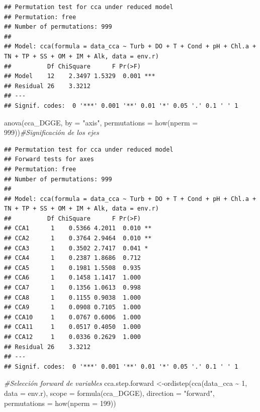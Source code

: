\documentclass[
]{book}
\newenvironment{Shaded}{\begin{snugshade}}{\end{snugshade}}
\newcommand{\AttributeTok}[1]{\textcolor[rgb]{0.77,0.63,0.00}{#1}}
\newcommand{\CommentTok}[1]{\textcolor[rgb]{0.56,0.35,0.01}{\textit{#1}}}
\newcommand{\DecValTok}[1]{\textcolor[rgb]{0.00,0.00,0.81}{#1}}
\newcommand{\FunctionTok}[1]{\textcolor[rgb]{0.00,0.00,0.00}{#1}}
\newcommand{\NormalTok}[1]{#1}
\newcommand{\OtherTok}[1]{\textcolor[rgb]{0.56,0.35,0.01}{#1}}
\newcommand{\SpecialCharTok}[1]{\textcolor[rgb]{0.00,0.00,0.00}{#1}}
\newcommand{\StringTok}[1]{\textcolor[rgb]{0.31,0.60,0.02}{#1}}
\begin{document}
\begin{verbatim}
## Permutation test for cca under reduced model
## Permutation: free
## Number of permutations: 999
## 
## Model: cca(formula = data_cca ~ Turb + DO + T + Cond + pH + Chl.a + TN + TP + SS + OM + IM + Alk, data = env.r)
##          Df ChiSquare      F Pr(>F)    
## Model    12    2.3497 1.5329  0.001 ***
## Residual 26    3.3212                  
## ---
## Signif. codes:  0 '***' 0.001 '**' 0.01 '*' 0.05 '.' 0.1 ' ' 1
\end{verbatim}

\begin{Shaded}
\begin{Highlighting}[]
\FunctionTok{anova}\NormalTok{(cca\_DGGE, }\AttributeTok{by =} \StringTok{"axis"}\NormalTok{, }\AttributeTok{permutations =} \FunctionTok{how}\NormalTok{(}\AttributeTok{nperm =} \DecValTok{999}\NormalTok{))}\CommentTok{\#Significación de los ejes}
\end{Highlighting}
\end{Shaded}

\begin{verbatim}
## Permutation test for cca under reduced model
## Forward tests for axes
## Permutation: free
## Number of permutations: 999
## 
## Model: cca(formula = data_cca ~ Turb + DO + T + Cond + pH + Chl.a + TN + TP + SS + OM + IM + Alk, data = env.r)
##          Df ChiSquare      F Pr(>F)   
## CCA1      1    0.5366 4.2011  0.010 **
## CCA2      1    0.3764 2.9464  0.010 **
## CCA3      1    0.3502 2.7417  0.041 * 
## CCA4      1    0.2387 1.8686  0.712   
## CCA5      1    0.1981 1.5508  0.935   
## CCA6      1    0.1458 1.1417  1.000   
## CCA7      1    0.1356 1.0613  0.998   
## CCA8      1    0.1155 0.9038  1.000   
## CCA9      1    0.0908 0.7105  1.000   
## CCA10     1    0.0767 0.6006  1.000   
## CCA11     1    0.0517 0.4050  1.000   
## CCA12     1    0.0336 0.2629  1.000   
## Residual 26    3.3212                 
## ---
## Signif. codes:  0 '***' 0.001 '**' 0.01 '*' 0.05 '.' 0.1 ' ' 1
\end{verbatim}

\begin{Shaded}
\begin{Highlighting}[]
\CommentTok{\#Selección forward de variables}
\NormalTok{cca.step.forward }\OtherTok{\textless{}{-}}\FunctionTok{ordistep}\NormalTok{(}\FunctionTok{cca}\NormalTok{(data\_cca }\SpecialCharTok{\textasciitilde{}} \DecValTok{1}\NormalTok{, }\AttributeTok{data =}\NormalTok{ env.r), }\AttributeTok{scope =} \FunctionTok{formula}\NormalTok{(cca\_DGGE),}
\AttributeTok{direction =} \StringTok{"forward"}\NormalTok{, }\AttributeTok{permutations =} \FunctionTok{how}\NormalTok{(}\AttributeTok{nperm =} \DecValTok{199}\NormalTok{))}
\end{Highlighting}
\end{Shaded}
\end{document}
